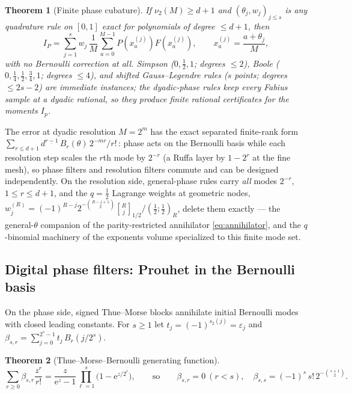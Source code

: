 \documentclass[11pt,oneside]{article}
\numberwithin{equation}{section}
\newtheorem{theorem}{Theorem}[section]
\theoremstyle{definition}
\theoremstyle{remark}
\newcommand{\e}{\mathrm e}
\newcommand{\eps}{\varepsilon}
\newcommand{\vtwo}{\nu_2}
\newcommand{\fall}[2]{#1^{\underline{#2}}}
\begin{document}
\begin{theorem}[Finite phase cubature]
\label{thm:phase-cubature}
If $\vtwo(M)\ge d+1$ and $(\theta_j,w_j)_{j\le s}$ is any quadrature
rule on $[0,1]$ exact for polynomials of degree $\le d+1$, then
\begin{equation}
 \boxed{\;
 I_P=\sum_{j=1}^{s}w_j\,
 \frac1M\sum_{a=0}^{M-1}P(x_a^{(j)})F(x_a^{(j)}),
 \qquad x_a^{(j)}=\frac{a+\theta_j}{M},\;}
 \label{eq:phase-cubature}
\end{equation}
with \emph{no Bernoulli correction at all}.  Simpson
($0,\tfrac12,1$; degrees $\le2$), Boole
($0,\tfrac14,\tfrac12,\tfrac34,1$; degrees $\le4$), and shifted
Gauss--Legendre rules ($s$ points; degrees $\le2s-2$) are immediate
instances; the dyadic-phase rules keep every Fabius sample at a
dyadic rational, so they produce finite \emph{rational certificates}
for the moments $I_p$.
\end{theorem}

The error at dyadic resolution $M=2^{m}$ has the exact separated
finite-rank form
$\sum_{r\le d+1}\fall d{r-1}\,B_r(\theta)\,2^{-mr}/r!$\,: phase
acts on the Bernoulli basis while each resolution step scales the
$r$th mode by $2^{-r}$ (a Ruffa layer by $1-2^{r}$ at the fine mesh),
so phase filters and resolution filters commute and can be designed
independently.  On the resolution side, general-phase rules carry
\emph{all} modes $2^{-r}$, $1\le r\le d+1$, and the $q=\tfrac12$
Lagrange weights at geometric nodes,
$w_j^{(R)}=(-1)^{R-j}2^{-\binom{R-j+1}2}
\genfrac{[}{]}{0pt}{}{R}{j}_{1/2}/(\tfrac12;\tfrac12)_R$, delete them
exactly --- the general-$\theta$ companion of the parity-restricted
annihilator \eqref{eq:annihilator}, and the $q$-binomial machinery of
the exponents volume specialized to this finite mode set.

\subsection{Digital phase filters: Prouhet in the Bernoulli basis}

On the phase side, signed Thue--Morse blocks annihilate initial
Bernoulli modes with closed leading constants.  For $s\ge1$ let
$t_j=(-1)^{s_2(j)}=\eps_j$ and
$\beta_{s,r}=\sum_{j=0}^{2^{s}-1}t_j\,B_r(j/2^{s})$.

\begin{theorem}[Thue--Morse--Bernoulli generating function]
\label{thm:tm-bernoulli-egf}
\begin{equation}
 \sum_{r\ge0}\beta_{s,r}\frac{z^{r}}{r!}
 =\frac{z}{\e^{z}-1}\prod_{\ell=1}^{s}
 \bigl(1-\e^{z/2^{\ell}}\bigr),
 \qquad\text{so}\qquad
 \beta_{s,r}=0\ (r<s),
 \quad
 \beta_{s,s}=(-1)^{s}\,s!\,2^{-\binom{s+1}2}.
 \label{eq:tm-bernoulli-egf}
\end{equation}
\end{theorem}
\end{document}
